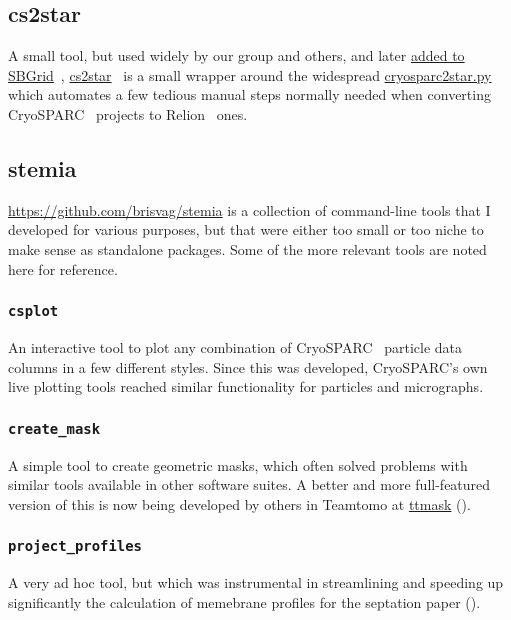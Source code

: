 \subsection{cs2star}

A small tool, but used widely by our group and others, and later \href{https://sbgrid.org/software/titles/cs2star}{added to SBGrid}~\cite{morinCuttingEdgeCollaboration2013}, \href{https://github.com/brisvag/cs2star}{cs2star}~\cite{gaifasCs2starPy2021} is a small wrapper around the widespread \href{https://github.com/asarnow/pyem}{cryosparc2star.py} which automates a few tedious manual steps normally needed when converting CryoSPARC~\cite{punjaniCryoSPARCAlgorithmsRapid2017} projects to Relion~\cite{scheresRELIONImplementationBayesian2012} ones.

\subsection{stemia}

\href{Stemia}{https://github.com/brisvag/stemia} is a collection of command-line tools that I developed for various purposes, but that were either too small or too niche to make sense as standalone packages.
Some of the more relevant tools are noted here for reference.


\subsubsection{\texttt{csplot}}
An interactive tool to plot any combination of CryoSPARC~\cite{punjaniCryoSPARCAlgorithmsRapid2017} particle data columns in a few different styles.
Since this was developed, CryoSPARC's own live plotting tools reached similar functionality for particles and micrographs.

\subsubsection{\texttt{create\_mask}}
A simple tool to create geometric masks, which often solved problems with similar tools available in other software suites.
A better and more full-featured version of this is now being developed by others in Teamtomo at \href{https://github.com/teamtomo/ttmask}{ttmask} ().

\subsubsection{\texttt{project\_profiles}}
A very ad hoc tool, but which was instrumental in streamlining and speeding up significantly the calculation of memebrane profiles for the septation paper ().


